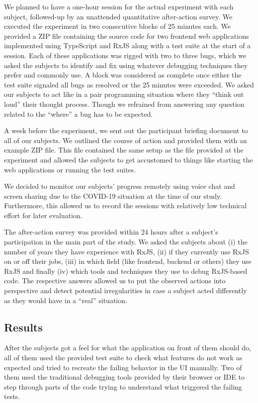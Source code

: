 \documentclass[12pt,a4paper]{article}
\begin{document}
We planned to have a one-hour session for the actual experiment with each subject, followed-up by an unattended quantitative after-action survey. We executed the experiment in two consecutive blocks of 25 minutes each. We provided a ZIP file containing the source code for two frontend web applications implemented using TypeScript and RxJS along with a test suite at the start of a session. Each of these applications was rigged with two to three bugs, which we asked the subjects to identify and fix using whatever debugging techniques they prefer and commonly use. A block was considered as complete once either the test suite signaled all bugs as resolved or the 25 minutes were exceeded. We asked our subjects to act like in a pair programming situation where they ``think out loud'' their thought process. Though we refrained from answering any question related to the ``where'' a bug has to be expected.

A week before the experiment, we sent out the participant briefing document to all of our subjects. We outlined the course of action and provided them with an example ZIP file. This file contained the same setup as the file provided at the experiment and allowed the subjects to get accustomed to things like starting the web applications or running the test suites.

We decided to monitor our subjects' progress remotely using voice chat and screen sharing due to the COVID-19 situation at the time of our study. Furthermore, this allowed us to record the sessions with relatively low technical effort for later evaluation.

The after-action survey was provided within 24 hours after a subject's participation in the main part of the study. We asked the subjects about (i) the number of years they have experience with RxJS, (ii) if they currently use RxJS on or off their jobs, (iii) in which field (like frontend, backend or others) they use RxJS and finally (iv) which tools and techniques they use to debug RxJS-based code. The respective answers allowed us to put the observed actions into perspective and detect potential irregularities in case a subject acted differently as they would have in a ``real'' situation.

\subsection{Results}

After the subjects got a feel for what the application on front of them should do, all of them used the provided test suite to check what features do not work as expected and tried to recreate the failing behavior in the UI manually. Two of them used the traditional debugging tools provided by their browser or IDE to step through parts of the code trying to understand what triggered the failing tests.
\end{document}
